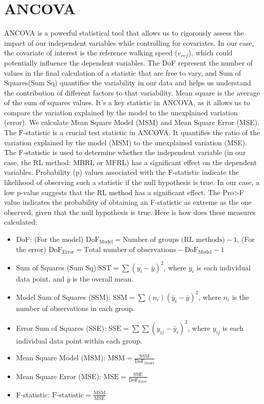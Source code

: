 \section{ANCOVA}
\label{Sec:ANCOVA}
ANCOVA is a powerful statistical tool that allows us to rigorously assess the impact of our independent variables while controlling for covariates.  In our case, the covariate of interest is the reference walking speed ($v_{ref}$), which could potentially influence the dependent variables. The \ac{DoF}  represent the number of values in the final calculation of a statistic that are free to vary, and Sum of Squares(Sum Sq) quantifies the variability in our data and helps us understand the contribution of different factors to that variability. Mean square is the average of the sum of squares values. It's a key statistic in ANCOVA, as it allows us to compare the variation explained by the model to the unexplained variation (error). We calculate Mean Square Model (MSM) and Mean Square Error (MSE). The F-statistic is a crucial test statistic in ANCOVA. It quantifies the ratio of the variation explained by the model (MSM) to the unexplained variation (MSE). The F-statistic is used to determine whether the independent variable (in our case, the RL method: MBRL or MFRL) has a significant effect on the dependent variables. Probability (p) values associated with the F-statistic indicate the likelihood of observing such a statistic if the null hypothesis is true. In our case, a low p-value suggests that the RL method has a significant effect. The Pro>F value indicates the probability of obtaining an F-statistic as extreme as the one observed, given that the null hypothesis is true. Here is how does these measures calculated:

\begin{itemize}
    \item \ac{DoF}: (For the model) $\text{DoF}_{\text{Model}} = \text{Number of groups (RL methods)} - 1$, (For the error) $\text{DoF}_{\text{Error}} = \text{Total number of observations} - \text{DoF}_{\text{Model}} - 1$
    \item Sum of Squares (Sum Sq):$\text{SST} = \sum(y_i - \bar{y})^2$, where $y_i$ is each individual data point, and $\bar{y}$ is the overall mean.
    \item Model Sum of Squares (SSM): $\text{SSM} = \sum(n_i)(\bar{y}_i - \bar{y})^2$,  where $n_i$ is the number of observations in each group.
    \item Error Sum of Squares (SSE): $\text{SSE} = \sum\sum(y_{ij} - \bar{y}_i)^2$, where $y_{ij}$ is each individual data point within each group.
    \item Mean Square Model (MSM): $\text{MSM} = \frac{\text{SSM}}{\text{DoF}_{\text{Model}}}$
    \item Mean Square Error (MSE): $\text{MSE} = \frac{\text{SSE}}{\text{DoF}_{\text{Error}}}$
    \item F-statistic: $\text{F-statistic} = \frac{\text{MSM}}{\text{MSE}}$
\end{itemize}

